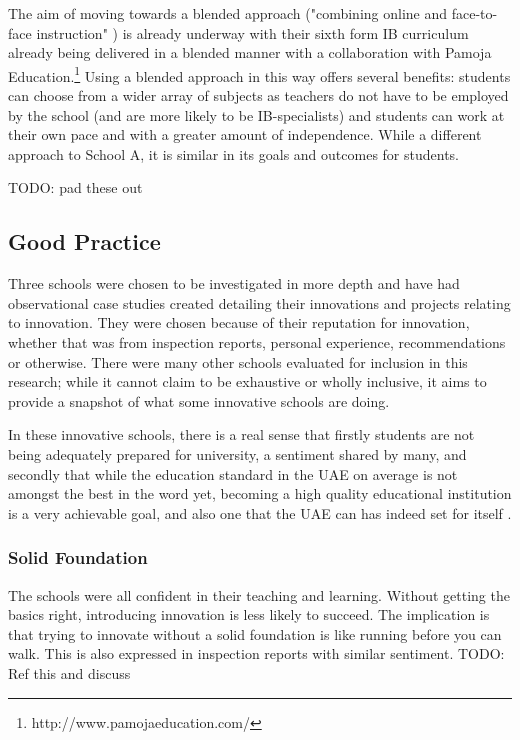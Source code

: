 The aim of moving towards a blended approach ("combining online and face-to-face instruction" \cite{bonk2006handbook}) is already underway with their sixth form IB curriculum already being delivered in a blended manner with a collaboration with Pamoja Education.\footnote{http://www.pamojaeducation.com/} Using a blended approach in this way offers several benefits: students can choose from a wider array of subjects as teachers do not have to be employed by the school (and are more likely to be IB-specialists) and students can work at their own pace and with a greater amount of independence. While a different approach to School A, it is similar in its goals and outcomes for students.

TODO: pad these out

\subsection{Good Practice}
Three schools were chosen to be investigated in more depth and have had observational case studies created detailing their innovations and projects relating to innovation. They were chosen because of their reputation for innovation, whether that was from inspection reports, personal experience, recommendations or otherwise. There were many other schools evaluated for inclusion in this research; while it cannot claim to be exhaustive or wholly inclusive, it aims to provide a snapshot of what some innovative schools are doing. 

In these innovative schools, there is a real sense that firstly students are not being adequately prepared for university, a sentiment shared by many, \citep{Ali2016,Moussly2012} and secondly that while the education standard in the UAE on average is not amongst the best in the word yet, \cite{2013} becoming a high quality educational institution is a very achievable goal, and also one that the UAE can has indeed set for itself \cite{UAEGovernment2012}.

\subsubsection{Solid Foundation}
The schools were all confident in their teaching and learning. Without getting the basics right, introducing innovation is less likely to succeed. The implication is that trying to innovate without a solid foundation is like running before you can walk. This is also expressed in inspection reports with similar sentiment. TODO: Ref this and discuss

